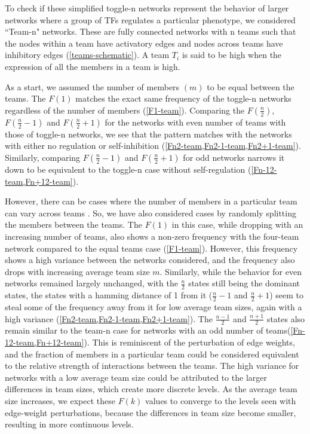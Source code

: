\documentclass[11pt,a4paper]{article}
\theoremstyle{definition}
\theoremstyle{remark}
\begin{document}
To check if these simplified toggle-n networks represent the behavior of larger networks where a group of TFs regulates a particular phenotype, we considered ``Team-n" networks. These are fully connected networks with n teams such that the nodes within a team have activatory edges and nodes across teams have inhibitory edges (\cref{teams-schematic}). A team $T_i$ is said to be high when the expression of all the members in a team is high. 

As a start, we assumed the number of members $(m)$ to be equal between the teams. The $F(1)$ matches the exact same frequency of the toggle-n networks regardless of the number of members (\cref{F1-team}). Comparing the $F(\frac{n}{2})$, $F(\frac{n}{2}-1)$ and $F(\frac{n}{2}+1)$ for the networks with even number of teams with those of toggle-n networks, we see that the pattern matches with the networks with either no regulation or self-inhibition (\cref{Fn2-team,Fn2-1-team,Fn2+1-team}). Similarly, comparing $F(\frac{n}{2}-1)$ and $F(\frac{n}{2}+1)$ for odd networks narrows it down to be equivalent to the toggle-n case without self-regulation (\cref{Fn-12-team,Fn+12-team}).

However, there can be cases where the number of members in a particular team can vary across teams \parencite{chauhan_topological_2021}. So, we have also considered cases by randomly splitting the members between the teams. The $F(1)$ in this case, while dropping with an increasing number of teams, also shows a non-zero frequency with the four-team network compared to the equal teams case (\cref{F1-team}). However, this frequency shows a high variance between the networks considered, and the frequency also drops with increasing average team size $m$. Similarly, while the behavior for even networks remained largely unchanged, with the $\frac{n}{2}$ states still being the dominant states, the states with a hamming distance of 1 from it ($\frac{n}{2}-1$ and $\frac{n}{2}+1$) seem to steal some of the frequency away from it for low average team sizes, again with a high variance (\cref{Fn2-team,Fn2-1-team,Fn2+1-team}). The $\frac{n-1}{2}$ and $\frac{n+1}{2}$ states also remain similar to the team-n case for networks with an odd number of teams(\cref{Fn-12-team,Fn+12-team}). This is reminiscent of the perturbation of edge weights, and the fraction of members in a particular team could be considered equivalent to the relative strength of interactions between the teams. The high variance for networks with a low average team size could be attributed to the larger differences in team sizes, which create more discrete levels. As the average team size increases, we expect these $F(k)$ values to converge to the levels seen with edge-weight perturbations, because the differences in team size become smaller, resulting in more continuous levels.
\end{document}
